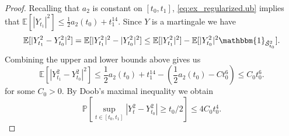 \documentclass[12pt,oneside]{amsart}
\theoremstyle{definition}
\newcommand{\Scc}{\hat{\mathcal S}}
\def\P{{\mathbb P}}
\def\E{{\mathbb E}}
\numberwithin{equation}{section}
\begin{document}
\begin{proof}
    Recalling that $a_2$ is constant on $[t_0,t_1]$, \eqref{eq:ex_regularized.ub} implies that $\E[|Y_{t_1}|^2] \leq \frac12 a_2(t_0) + t_1^{14}$.
    Since $Y$ is a martingale we have
    \begin{equation}
    	 \E[|Y_{t_1}^2 - Y^2_{t_0}|^2] = \E[|Y_{t_1}^2|^2 - |Y_{t_0}^2|^2] \le \E[|Y_{t_1}^2|^2] - \E[|Y_{t_0}^2|^2\mathbbm{1}_{\Scc_{t_0}^2}].
    \end{equation}
    Combining the upper and lower bounds above gives us
    \begin{equation}
        \label{eq:ex_regularized.claim1}
        \E[|Y_{t_1}^2 - Y^2_{t_0}|^2] \le \frac12 a_2(t_0) + t_1^{14} - \!\left(\frac12 a_2(t_0) - Ct_0^6\right)\! \le C_0 t_0^6.
    \end{equation}
    for some $C_0 > 0$.
    By Doob's maximal inequality we obtain
    \begin{equation}
        \label{eq:ex_regularized.2_Doob1}
        \P[\sup_{t \in [t_0,t_1]} |Y^2_t - Y_{t_0}^2| \ge t_0 / 2] \le 4 C_0 t^4_0.
    \end{equation}


\end{proof}
\end{document}
